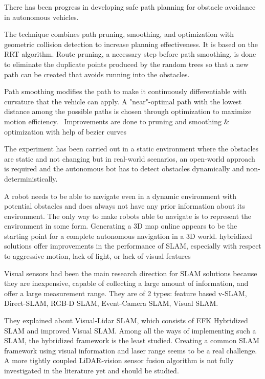 \documentclass[conference]{IEEEtran}
\begin{document}
There has been progress in developing safe path planning for obstacle avoidance in autonomous vehicles.

The technique combines path pruning, smoothing, and optimization with geometric collision detection to increase planning effectiveness. It is based on the RRT algorithm. Route pruning, a necessary step before path smoothing, is done to eliminate the duplicate points produced by the random trees so that a new path can be created that avoids running into the obstacles.

Path smoothing modifies the path to make it continuously differentiable with curvature that the vehicle can apply. A "near"-optimal path with the lowest distance among the possible paths is chosen through optimization to maximize motion efficiency.  Improvements are done to pruning and smoothing & optimization with help of bezier curves

The experiment has been carried out in a static environment where the obstacles are static and not changing but in real-world scenarios, an open-world approach is required and the autonomous bot has to detect obstacles dynamically and non-deterministically\cite{yang2021rrt}.




A robot needs to be able to navigate even in a dynamic environment with potential obstacles and does always not have any prior information about its environment. The only way to make robots able to navigate is to represent the environment in some form. Generating a 3D map online appears to be the starting point for a complete autonomous navigation in a 3D world. hybridized solutions offer improvements in the performance of SLAM, especially with respect to aggressive motion, lack of light, or lack of visual features

Visual sensors had been the main research direction for SLAM solutions because they are inexpensive, capable of collecting a large amount of information, and offer a large measurement range. They are of 2 types: feature based v-SLAM, Direct-SLAM, RGB-D SLAM, Event-Camera SLAM, Visual SLAM.

They explained about Visual-Lidar SLAM, which consists of EFK Hybridized SLAM and improved Visual SLAM. Among all the ways of implementing such a SLAM, the hybridized framework is the least studied. Creating a common SLAM framework using visual information and laser range seems to be a real challenge. A more tightly coupled LiDAR-vision sensor fusion algorithm is not fully investigated in the literature yet and should be studied\cite{debeunne2020vlidar}.
\end{document}
